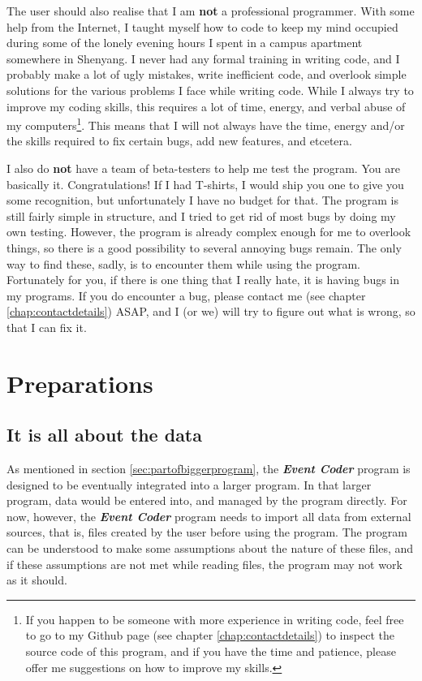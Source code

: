 \documentclass{memoir}
\begin{document}
The user should also realise that I am \textbf{not} a professional programmer. With some help from the Internet, I taught myself how to code to keep my mind occupied during some of the lonely evening hours I spent in a campus apartment somewhere in Shenyang. I never had any formal training in writing code, and I probably make a lot of ugly mistakes, write inefficient code, and overlook simple solutions for the various problems I face while writing code. While I always try to improve my coding skills, this requires a lot of time, energy, and verbal abuse of my computers\footnote{If you happen to be someone with more experience in writing code, feel free to go to my Github page (see chapter \ref{chap:contactdetails}) to inspect the source code of this program, and if you have the time and patience, please offer me suggestions on how to improve my skills.}. This means that I will not always have the time, energy and/or the skills required to fix certain bugs, add new features, and etcetera.

I also do \textbf{not} have a team of beta-testers to help me test the program. You are basically it. Congratulations! If I had T-shirts, I would ship you one to give you some recognition, but unfortunately I have no budget for that. The program is still fairly simple in structure, and I tried to get rid of most bugs by doing my own testing. However, the program is already complex enough for me to overlook things, so there is a good possibility to several annoying bugs remain. The only way to find these, sadly, is to encounter them while using the program. Fortunately for you, if there is one thing that I really hate, it is having bugs in my programs. If you do encounter a bug, please contact me (see chapter \ref{chap:contactdetails}) ASAP, and I (or we) will try to figure out what is wrong, so that I can fix it.



\chapter{Preparations}
\label{chap:preparations}

\section{It is all about the data}
\label{sec:allaboutdata}


As mentioned in section \ref{sec:partofbiggerprogram}, the \textbf{\emph{Event Coder}} program is designed to be eventually integrated into a larger program. In that larger program, data would be entered into, and managed by the program directly. For now, however, the \textbf{\emph{Event Coder}} program needs to import all data from external sources, that is, files created by the user before using the program. The program can be understood to make some assumptions about the nature of these files, and if these assumptions are not met while reading files, the program may not work as it should.
\end{document}
